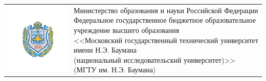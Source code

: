 \documentclass[../template.tex]{subfiles}
\begin{document}
	\begin{titlepage}
		\vspace*{-2.5cm}
		\begin{center}
			\begin{tabular}{C{3cm}C{13cm}}\vspace{-0.5cm}
				\includegraphics[trim=10 10 10 10,clip,width=\linewidth]{../images/titul/mgtu.pdf}&{\small {}
				Министерство образования и науки Российской Федерации\newline
				Федеральное государственное бюджетное образовательное\newline
				учреждение высшего образования\newline
				<<Московский государственный технический университет\newline
				имени Н.Э. Баумана\newline
				(национальный исследовательский университет)>>\newline
				(МГТУ им. Н.Э. Баумана)\par}
			\end{tabular}
		\end{center}
	
	\drawduallines
	

\end{titlepage}
\end{document}
